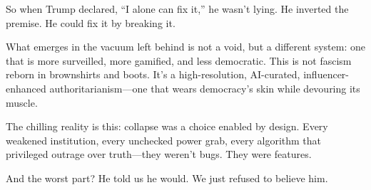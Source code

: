 \documentclass[12pt,openany]{book}
\begin{document}
So when Trump declared, “I alone can fix it,” he wasn’t lying. He inverted the premise. He could fix it by breaking it.

What emerges in the vacuum left behind is not a void, but a different system: one that is more surveilled, more gamified, and less democratic. This is not fascism reborn in brownshirts and boots. It’s a high-resolution, AI-curated, influencer-enhanced authoritarianism—one that wears democracy’s skin while devouring its muscle.

The chilling reality is this: collapse was a choice enabled by design. Every weakened institution, every unchecked power grab, every algorithm that privileged outrage over truth—they weren’t bugs. They were features.

And the worst part? He told us he would. We just refused to believe him.

\printbibliography
\end{document}
